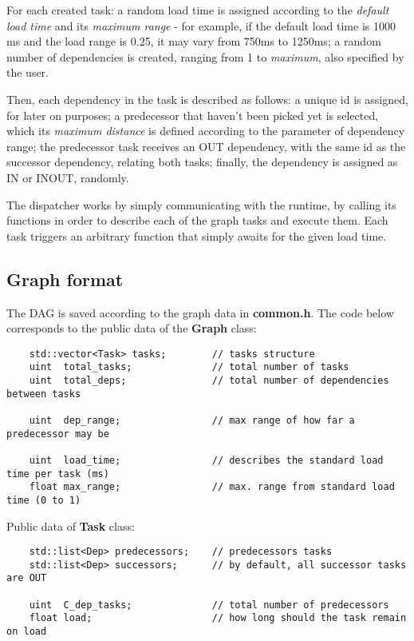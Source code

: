 \documentclass[a4paper,10pt]{article}
\begin{document}
       For each created task: a random load time is assigned according to the \textit{default load time} and its \textit{maximum range} - for example, if the default load time is 1000 ms and the load range is 0.25, it may vary from 750ms to 1250ms; a random number of dependencies is created, ranging from 1 to \textit{maximum}, also specified by the user. 

       Then, each dependency in the task is described as follows: a unique id is assigned, for later on purposes; a predecessor that haven't been picked yet is selected, which its \textit{maximum distance} is defined according to the parameter of dependency range; the predecessor task receives an OUT dependency, with the same id as the successor dependency, relating both tasks; finally, the dependency is assigned as IN or INOUT, randomly.

       The dispatcher works by simply communicating with the runtime, by calling its functions in order to describe each of the graph tasks and execute them. Each task triggers an arbitrary function that simply awaits for the given load time.

    \subsection{Graph format}
       The DAG is saved according to the graph data in \textbf{common.h}. The code below corresponds to the public data of the \textbf{Graph} class:

       \begin{lstlisting}
    std::vector<Task> tasks;        // tasks structure
    uint  total_tasks;              // total number of tasks
    uint  total_deps;               // total number of dependencies between tasks

    uint  dep_range;                // max range of how far a predecessor may be

    uint  load_time;                // describes the standard load time per task (ms)
    float max_range;                // max. range from standard load time (0 to 1) 
       \end{lstlisting}

       Public data of \textbf{Task} class:

       \begin{lstlisting}
    std::list<Dep> predecessors;    // predecessors tasks
    std::list<Dep> successors;      // by default, all successor tasks are OUT

    uint  C_dep_tasks;              // total number of predecessors
    float load;                     // how long should the task remain on load
       \end{lstlisting}
\end{document}
